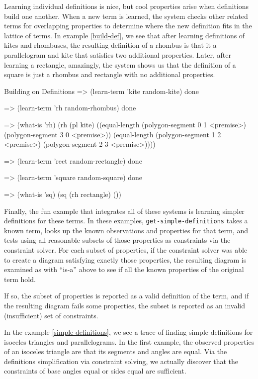 Learning individual definitions is nice, but cool properties arise
when definitions build one another. When a new term is learned, the
system checks other related terms for overlapping properties to
determine where the new definition fits in the lattice of terms. In
example \ref{build-def}, we see that after learning definitions of
kites and rhombuses, the resulting definition of a rhombus is that it
a parallelogram and kite that satisfies two additional
properties. Later, after learning a rectangle, amazingly, the system
shows us that the definition of a square is just a rhombus and
rectangle with no additional properties.

\begin{repl-example}
[label=build-def]
{Building on Definitions}
=> (learn-term 'kite random-kite)
done

=> (learn-term 'rh random-rhombus)
done

=> (what-is 'rh)
(rh
 (pl kite)
 ((equal-length (polygon-segment 0 1 <premise>)
                (polygon-segment 3 0 <premise>))
  (equal-length (polygon-segment 1 2 <premise>)
                (polygon-segment 2 3 <premise>))))

=> (learn-term 'rect random-rectangle)
done

=> (learn-term 'square random-square)
done

=> (what-is 'sq)
(sq (rh rectangle) ())
\end{repl-example}

Finally, the fun example that integrates all of these systems is
learning simpler definitions for these terms. In these examples,
\texttt{get-simple-definitions} takes a known term, looks up the known
observations and properties for that term, and tests using all
reasonable subsets of those properties as constraints via the
constraint solver. For each subset of properties, if the constraint
solver was able to create a diagram satisfying exactly those
properties, the resulting diagram is examined as with ``is-a'' above
to see if all the known properties of the original term hold.

If so, the subset of properties is reported as a valid definition of
the term, and if the resulting diagram fails some properties, the
subset is reported as an invalid (insufficient) set of constraints.

In the example \ref{simple-definitions}, we see a trace of finding
simple definitions for isoceles triangles and parallelograms. In the
first example, the observed properties of an isoceles triangle are
that its segments and angles are equal. Via the definitions
simplification via constraint solving, we actually discover that the
constraints of base angles equal or sides equal are sufficient.

